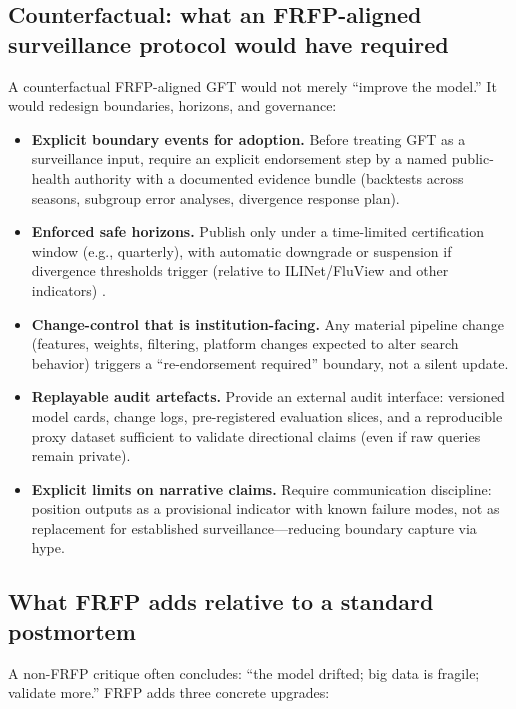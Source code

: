 \subsection{Counterfactual: what an FRFP-aligned surveillance protocol would have required}

A counterfactual FRFP-aligned GFT would not merely “improve the model.” It would redesign boundaries, horizons, and governance:

\begin{itemize}
  \item \textbf{Explicit boundary events for adoption.}
        Before treating GFT as a surveillance input, require an explicit endorsement step by a named public-health authority with a documented evidence bundle (backtests across seasons, subgroup error analyses, divergence response plan).

  \item \textbf{Enforced safe horizons.}
        Publish only under a time-limited certification window (e.g., quarterly), with automatic downgrade or suspension if divergence thresholds trigger (relative to ILINet/FluView and other indicators) \cite{CDCILINetOverview}.

  \item \textbf{Change-control that is institution-facing.}
        Any material pipeline change (features, weights, filtering, platform changes expected to alter search behavior) triggers a “re-endorsement required” boundary, not a silent update.

  \item \textbf{Replayable audit artefacts.}
        Provide an external audit interface: versioned model cards, change logs, pre-registered evaluation slices, and a reproducible proxy dataset sufficient to validate directional claims (even if raw queries remain private).

  \item \textbf{Explicit limits on narrative claims.}
        Require communication discipline: position outputs as a provisional indicator with known failure modes, not as replacement for established surveillance—reducing boundary capture via hype.
\end{itemize}

\subsection{What FRFP adds relative to a standard postmortem}

A non-FRFP critique often concludes: “the model drifted; big data is fragile; validate more.” FRFP adds three concrete upgrades:

